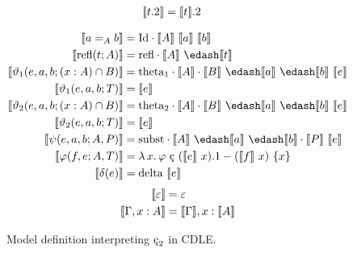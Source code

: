 \begin{figure}
\begin{minipage}{0.5\textwidth}
\begin{align*}
            \llbracket t.2 \rrbracket &= \llbracket t \rrbracket.2
        \end{align*}
    \end{minipage}
    \begin{align*}
        \sema{a =_A b} &= \cId \cdot \sema{A}\ \sema{a}\ \sema{b} \\
        \sema{\text{refl}(t; A)} &= \crefl \cdot \sema{A}\ \edash \sema{t} \\
        \sema{\vartheta_1(e, a, b; (x : A) \cap B)} &= \cthetaone \cdot \sema{A} \cdot \sema{B}\ \edash \sema{a}\ \edash \sema{b}\ \sema{e} \\
        \sema{\vartheta_1(e, a, b; T)} &= \sema{e} \\
        \sema{\vartheta_2(e, a, b; (x : A) \cap B)} &= \cthetatwo \cdot \sema{A} \cdot \sema{B}\ \edash \sema{a}\ \edash \sema{b}\ \sema{e} \\
        \sema{\vartheta_2(e, a, b; T)} &= \sema{e} \\
        \sema{\psi(e, a, b; A, P)} &= \csubst  \cdot \sema{A}\ \edash \sema{a}\ \edash \sema{b} \cdot \sema{P}\ \sema{e} \\
        \sema{\varphi(f, e; A, T)} &= \absu{\lambda}{x}{\varphi\ \text{\c{c}}\ (\sema{e}\ x).1 - (\sema{f}\ x)\ \{ x \} } \\
        \sema{\delta(e)} &= \cdelta\ \sema{e}
    \end{align*}
    \begin{align*}
        \llbracket \varepsilon \rrbracket &= \varepsilon \\
        \llbracket \Gamma, x : A \rrbracket &= \llbracket \Gamma \rrbracket, x : \llbracket A \rrbracket
    \end{align*}
    \caption{
        Model definition interpreting $\ced$ in CDLE.
    }
    \label{fig:4:model}
\end{figure}

